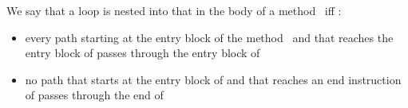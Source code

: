 
\begin{defn}
\label{nestedLoops}
We say that a loop  is nested into   that in the body of a method \method \   iff :
\begin{itemize}
\item every path starting at the entry block  of the method \method \  and that reaches the entry block of  passes through the entry block of 
\item no path that starts at the entry block of  and that reaches an end instruction of  passes through the end of 
\end{itemize}
\end{defn}

